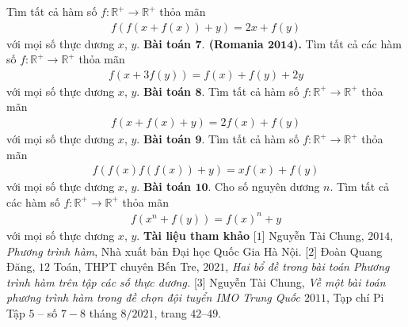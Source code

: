 \begin{multicols}{2}
	Tìm tất cả hàm số $f: \mathbb{R}^{+} \rightarrow \mathbb{R}^{+}$ thỏa mãn
	\begin{align*}
		f(f(x+f(x))+y)=2 x+f(y)
	\end{align*}
	với mọi số thực dương $x$, $y$.
	\vskip 0.1cm
	\textbf{\color{hoccungpi}Bài toán $\pmb{7.}$ (Romania $\pmb{2014}$).}
	Tìm tất cả các hàm số $f: \mathbb{R}^{+} \rightarrow \mathbb{R}^{+}$ thỏa mãn
	\begin{align*}
		f(x+3 f(y))=f(x)+f(y)+2 y 
	\end{align*}
	với mọi số thực dương $x$, $y$.
	\vskip 0.1cm
	\textbf{\color{hoccungpi}Bài toán $\pmb{8.}$}	Tìm tất cả hàm số $f: \mathbb{R}^{+} \rightarrow \mathbb{R}^{+}$ thỏa mãn
	\begin{align*}
		f(x+f(x)+y)=2 f(x)+f(y) 
	\end{align*}	
	với mọi số thực dương $x$, $y$.
	\vskip 0.1cm
	\textbf{\color{hoccungpi}Bài toán $\pmb{9.}$}
	Tìm tất cả hàm số $f: \mathbb{R}^{+} \rightarrow \mathbb{R}^{+}$ thỏa mãn
	\begin{align*}
		f(f(x) f(f(x))+y)=x f(x)+f(y)
	\end{align*}
	với mọi số thực dương $x$, $y$.
	\vskip 0.1cm
	\textbf{\color{hoccungpi}Bài toán $\pmb{10.}$}
	Cho số nguyên dương $n$.
	Tìm tất cả các hàm số $f:\mathbb{R}^{+}  \to \mathbb{R}^{+} $ thỏa mãn 
	\begin{align*}
		f\left( {{x^n} + f(y)} \right) = f(x)^n + y
	\end{align*}
	với mọi số thực dương $x$, $y$.
	\vskip 0.1cm	
	\textbf{\color{hoccungpi}Tài liệu tham khảo}
	\vskip 0.1cm
	[$1$] Nguyễn Tài Chung, $2014$, {\it Phương trình hàm}, {Nhà xuất bản Đại học Quốc Gia Hà Nội.}
	\vskip 0.1cm
	[$2$] Đoàn Quang Đăng, $12$ Toán, THPT chuyên Bến Tre, $2021$,
	{\it Hai bổ đề trong bài toán Phương trình hàm trên tập các số thực dương.}
	\vskip 0.1cm
	[$3$] Nguyễn Tài Chung, \textit{Về một bài toán phương trình hàm trong đề chọn đội tuyển IMO Trung Quốc $2011$}, Tạp chí Pi Tập $5$ -- số $7-8$ tháng $8/2021$,  trang $42$--$49$.
\end{multicols}